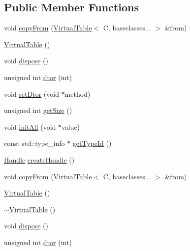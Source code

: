 \subsection*{Public Member Functions}
\begin{DoxyCompactItemize}
\item 
void \mbox{\hyperlink{structfakeit_1_1VirtualTable_a79d7c3b29e6da1ba1974c8c9d69fd7bd}{copy\+From}} (\mbox{\hyperlink{structfakeit_1_1VirtualTable}{Virtual\+Table}}$<$ C, baseclasses... $>$ \&from)
\item 
\mbox{\hyperlink{structfakeit_1_1VirtualTable_ae64da18818c25b107d8f9f2c615c4c37}{Virtual\+Table}} ()
\item 
void \mbox{\hyperlink{structfakeit_1_1VirtualTable_a58c2bfa93deb68aba5eced688c168e66}{dispose}} ()
\item 
unsigned int \mbox{\hyperlink{structfakeit_1_1VirtualTable_a7be0619d713b6ae2cac5722895176a14}{dtor}} (int)
\item 
void \mbox{\hyperlink{structfakeit_1_1VirtualTable_adee13076280ff9bd4c06b5f1e62d6708}{set\+Dtor}} (void $\ast$method)
\item 
unsigned int \mbox{\hyperlink{structfakeit_1_1VirtualTable_a014d48c976f89207564bf8d68b64a039}{get\+Size}} ()
\item 
void \mbox{\hyperlink{structfakeit_1_1VirtualTable_a261b66b33067b4425791762cb3786f20}{init\+All}} (void $\ast$value)
\item 
const std\+::type\+\_\+info $\ast$ \mbox{\hyperlink{structfakeit_1_1VirtualTable_a5ed35b122d5d06afced80ab93062bfa3}{get\+Type\+Id}} ()
\item 
\mbox{\hyperlink{classfakeit_1_1VirtualTable_1_1Handle}{Handle}} \mbox{\hyperlink{structfakeit_1_1VirtualTable_a616ff0e7567c8c5f368faff1dca949df}{create\+Handle}} ()
\item 
void \mbox{\hyperlink{structfakeit_1_1VirtualTable_a79d7c3b29e6da1ba1974c8c9d69fd7bd}{copy\+From}} (\mbox{\hyperlink{structfakeit_1_1VirtualTable}{Virtual\+Table}}$<$ C, baseclasses... $>$ \&from)
\item 
\mbox{\hyperlink{structfakeit_1_1VirtualTable_ae64da18818c25b107d8f9f2c615c4c37}{Virtual\+Table}} ()
\item 
\mbox{\hyperlink{structfakeit_1_1VirtualTable_a046d0399523ccbe9bf32a40db6c331de}{$\sim$\+Virtual\+Table}} ()
\item 
void \mbox{\hyperlink{structfakeit_1_1VirtualTable_a58c2bfa93deb68aba5eced688c168e66}{dispose}} ()
\item 
unsigned int \mbox{\hyperlink{structfakeit_1_1VirtualTable_a7be0619d713b6ae2cac5722895176a14}{dtor}} (int)

\end{DoxyCompactItemize}
